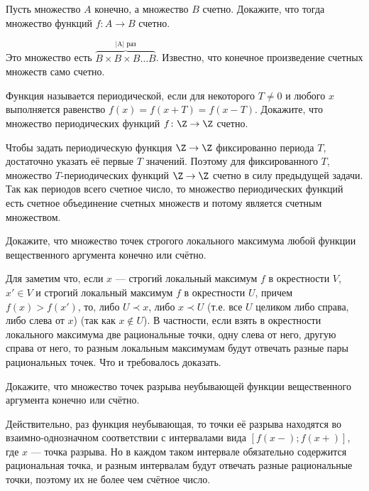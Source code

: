 \documentclass[a4paper,12pt,twoside]{article}
\begin{document}
\begin{?}
    Пусть множество $A$ конечно, а множество $B$ счетно. Докажите, что тогда множество функций $f\colon A \to B$ счетно.
\end{?}
\begin{solution}{}
    Это множество есть \(\overbrace{B \times B \times B \ldots B}^{\text{|A| раз}}\). Известно, что конечное произведение счетных множеств само счетно.
\end{solution}
\begin{?}
    Функция называется периодической, если для некоторого $T \neq 0$ и любого $x$ выполняется равенство $f(x) = f(x + T) = f(x - T)$. Докажите, что множество периодических функций $f \colon \Z \to \Z$  счетно.
\end{?}
\begin{solution}{}
    Чтобы задать периодическую функция \(\Z \to \Z\) фиксированно периода \(T\), достаточно указать её первые \(T\) значений. Поэтому для фиксированного \(T\), множество \(T\)-периодических функций \(\Z \to \Z\) счетно в силу предыдущей задачи. Так как периодов всего счетное число, то множество периодических функций есть счетное объединение счетных множеств и потому является счетным множеством.
\end{solution}
\begin{?}
    Докажите, что множество точек строгого локального максимума любой функции вещественного аргумента конечно или счётно.
\end{?}
\begin{solution}{}
    Для заметим что, если \(x\) --- строгий локальный максимум \(f\) в окрестности \(V\), \(x' \in V\) и строгий локальный максимум \(f\) в окрестности \(U\), причем \(f(x) > f(x')\), то, либо \(U \prec x\), либо \(x \prec U\) (т.е. все \(U\) целиком либо справа, либо слева от \(x\)) (так как \(x \not\in U\)). В частности, если взять в окрестности локального максимума две рациональные точки, одну слева от него, другую справа от него, то разным локальным максимумам будут отвечать разные пары рациональных точек. Что и требовалось доказать.
\end{solution}
\begin{?}
    Докажите, что множество точек разрыва неубывающей функции вещественного аргумента конечно или счётно.
\end{?}
\begin{solution}{}
    Действительно, раз функция неубывающая, то точки её разрыва находятся во взаимно-однозначном соответствии с интервалами вида \([f(x-); f(x+)]\), где \(x\) --- точка разрыва. Но в каждом таком интервале обязательно содержится рациональная точка, и разным интервалам будут отвечать разные рациональные точки, поэтому их не более чем счётное число.
\end{solution}
\end{document}
